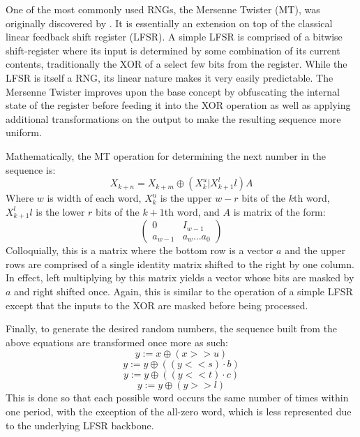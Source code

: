 One of the most commonly used RNGs, the Mersenne Twister (MT), was originally discovered by \cite{Matsumoto:1998:MTE:272991.272995}. It is essentially an extension on top of the classical linear feedback shift register (LFSR). A simple LFSR is comprised of a bitwise shift-register where its input is determined by some combination of its current contents, traditionally the XOR of a select few bits from the register. While the LFSR is itself a RNG, its linear nature makes it very easily predictable. The Mersenne Twister improves upon the base concept by obfuscating the internal state of the register before feeding it into the XOR operation as well as applying additional transformations on the output to make the resulting sequence more uniform.

Mathematically, the MT operation for determining the next number in the sequence is:
\begin{equation} \label{eq:mt}
    X_{k+n} = X_{k+m} \oplus \left(X_k^u | X_{k+1}^ll\right)A
\end{equation}
Where $w$ is width of each word, $X_k^u$ is the upper $w-r$ bits of the $k$th word, $X_{k+1}^ll$ is the lower $r$ bits of the $k+1$th word, and $A$ is matrix of the form:
\[ \left( \begin{array}{ccc}
0 & I_{w-1} \\
a_{w-1} & {a_w ... a_0} \end{array} \right)\]
Colloquially, this is a matrix where the bottom row is a vector $a$ and the upper rows are comprised of a single identity matrix shifted to the right by one column. In effect, left multiplying by this matrix yields a vector whose bits are masked by $a$ and right shifted once. Again, this is similar to the operation of a simple LFSR except that the inputs to the XOR are masked before being processed.

Finally, to generate the desired random numbers, the sequence built from the above equations are transformed once more as such:
\begin{equation} \label{eq:mt_t1}
    y := x \oplus (x >> u)
\end{equation}
\begin{equation} \label{eq:mt_t2}
    y := y \oplus ((y << s) \cdot b)
\end{equation}
\begin{equation} \label{eq:mt_t3}
    y := y \oplus ((y << t) \cdot c)
\end{equation}
\begin{equation} \label{eq:mt_t4}
    y := y \oplus (y >> l)
\end{equation}
This is done so that each possible word occurs the same number of times within one period, with the exception of the all-zero word, which is less represented due to the underlying LFSR backbone.

